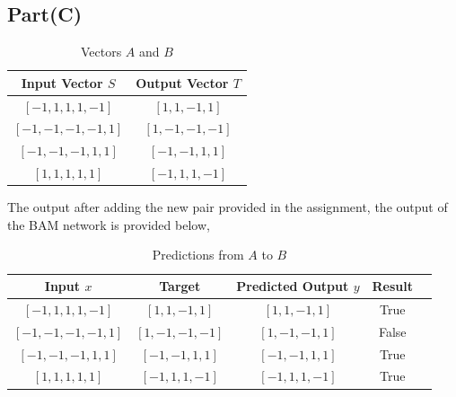 \documentclass[12pt]{article}
\begin{document}
\break

\subsection{Part(C)}
\begin{table}[ht]
    \centering
    \caption{Vectors \( A \) and \( B \)}
    \begin{tabular}{|c|c|}
        \hline
        \textbf{Input Vector \( S \)} & \textbf{Output Vector \( T \)} \\ \hline
        $[-1, 1, 1, 1, -1]$ & $[1, 1, -1, 1]$ \\ \hline
        $[-1, -1, -1, -1, 1]$ & $[1, -1, -1, -1]$ \\ \hline
        $[-1, -1, -1, 1, 1]$ & $[-1, -1, 1, 1]$ \\ \hline
        $[1, 1, 1, 1, 1]$ & $[-1, 1, 1, -1]$ \\ \hline
    \end{tabular}
\end{table}

The output after adding the new pair provided in the assignment, the output of the BAM network is provided below, 

\begin{table}[ht]
    \centering
    \caption{Predictions from \( A \) to \( B \)}
    \begin{tabular}{|c|c|c|c|c|}
        \hline
        \textbf{Input \( x \)} & \textbf{Target} & \textbf{Predicted Output \( y \)} & \textbf{Result} \\ \hline
        $[-1, 1, 1, 1, -1]$ & $[1, 1, -1, 1]$ & $[1, 1, -1, 1]$ & True \\ \hline
        $[-1, -1, -1, -1, 1]$ & $[1, -1, -1, -1]$ & $[1, -1, -1, 1]$ & False \\ \hline
        $[-1, -1, -1, 1, 1]$ & $[-1, -1, 1, 1]$ & $[-1, -1, 1, 1]$ & True \\ \hline
        $[1, 1, 1, 1, 1]$ & $[-1, 1, 1, -1]$ & $[-1, 1, 1, -1]$ & True \\ \hline
    \end{tabular}
\end{table}

\vspace{1cm} %
\end{document}
